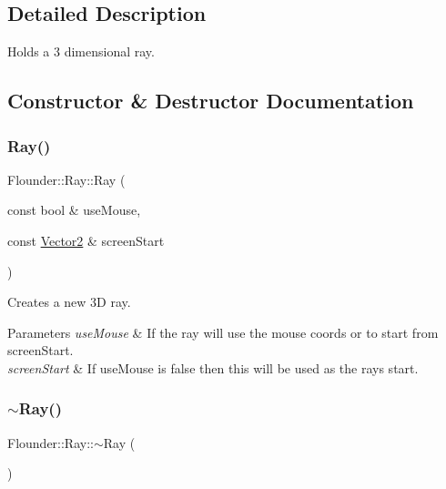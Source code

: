 \subsection{Detailed Description}
Holds a 3 dimensional ray. 



\subsection{Constructor \& Destructor Documentation}
\mbox{\label{class_flounder_1_1_ray_a4fc171269225a312d092908a9e252bd1}} 
\subsubsection{\texorpdfstring{Ray()}{Ray()}}
{\footnotesize\ttfamily Flounder\+::\+Ray\+::\+Ray (\begin{DoxyParamCaption}\item[{const bool \&}]{use\+Mouse,  }\item[{const \hyperlink{class_flounder_1_1_vector2}{Vector2} \&}]{screen\+Start }\end{DoxyParamCaption})}



Creates a new 3D ray. 


\begin{DoxyParams}{Parameters}
{\em use\+Mouse} & If the ray will use the mouse coords or to start from screen\+Start. \\
\hline
{\em screen\+Start} & If use\+Mouse is false then this will be used as the rays start. \\
\hline
\end{DoxyParams}
\mbox{\label{class_flounder_1_1_ray_a69de562de29c5ebf855ba28c69fc67b9}} 
\subsubsection{\texorpdfstring{$\sim$\+Ray()}{~Ray()}}
{\footnotesize\ttfamily Flounder\+::\+Ray\+::$\sim$\+Ray (\begin{DoxyParamCaption}{ }\end{DoxyParamCaption})}




